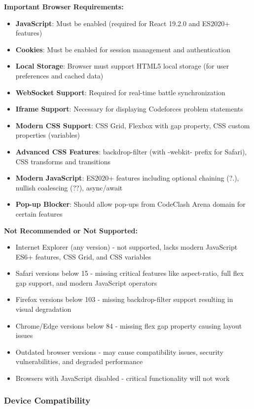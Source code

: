 \documentclass[12pt,a4paper]{article}
\begin{document}
\textbf{Important Browser Requirements:}
\begin{itemize}[leftmargin=*]
\item \textbf{JavaScript}: Must be enabled (required for React 19.2.0 and ES2020+ features)
\item \textbf{Cookies}: Must be enabled for session management and authentication
\item \textbf{Local Storage}: Browser must support HTML5 local storage (for user preferences and cached data)
\item \textbf{WebSocket Support}: Required for real-time battle synchronization
\item \textbf{Iframe Support}: Necessary for displaying Codeforces problem statements
\item \textbf{Modern CSS Support}: CSS Grid, Flexbox with gap property, CSS custom properties (variables)
\item \textbf{Advanced CSS Features}: backdrop-filter (with -webkit- prefix for Safari), CSS transforms and transitions
\item \textbf{Modern JavaScript}: ES2020+ features including optional chaining (?.), nullish coalescing (??), async/await
\item \textbf{Pop-up Blocker}: Should allow pop-ups from CodeClash Arena domain for certain features
\end{itemize}

\textbf{Not Recommended or Not Supported:}
\begin{itemize}[leftmargin=*]
\item Internet Explorer (any version) - not supported, lacks modern JavaScript ES6+ features, CSS Grid, and CSS variables
\item Safari versions below 15 - missing critical features like aspect-ratio, full flex gap support, and modern JavaScript operators
\item Firefox versions below 103 - missing backdrop-filter support resulting in visual degradation
\item Chrome/Edge versions below 84 - missing flex gap property causing layout issues
\item Outdated browser versions - may cause compatibility issues, security vulnerabilities, and degraded performance
\item Browsers with JavaScript disabled - critical functionality will not work
\end{itemize}

\subsubsection{Device Compatibility}
\end{document}
